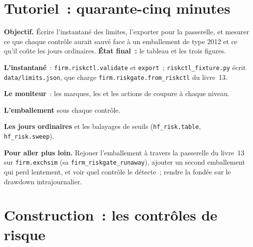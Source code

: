 \section{Tutoriel~: quarante-cinq minutes}\label{tut:hf:risk-controls:tut}

\begin{tutorial}
\textbf{Objectif.} Écrire l'instantané des limites, l'exporter pour la passerelle, et mesurer ce que chaque contrôle aurait sauvé face à un emballement de type 2012 et
ce qu'il coûte les jours ordinaires. \textbf{État final~:} le tableau et les trois figures.
\begin{tutsteps}
\item \textbf{L'instantané}~: \texttt{firm.riskctl.validate} et \texttt{export}~; \texttt{riskctl\_fixture.py} écrit
\texttt{data/limits.json}, que charge \texttt{firm.riskgate.from\_riskctl} du livre~13.
\item \textbf{Le moniteur}~: les marques, les  et les actions de coupure à chaque niveau.
\label{lst:hf:risk-controls:monitor}
\item \textbf{L'emballement} sous chaque contrôle.
\label{lst:hf:risk-controls:runaway}
\item \textbf{Les jours ordinaires} et les balayages de seuils (\texttt{hf\_risk.table}, \texttt{hf\_risk.sweep}).
\end{tutsteps}
\textbf{Pour aller plus loin.} Rejouer l'emballement à travers la passerelle du livre~13 sur \texttt{firm.exchsim} (sa \texttt{firm\_riskgate\_runaway}), ajouter un
second emballement qui perd lentement, et voir quel contrôle le détecte~; rendre la  fondée sur le drawdown intrajournalier.
\end{tutorial}

\section{Construction~: les contrôles de risque}\label{bld:hf:risk-controls:riskctl}

